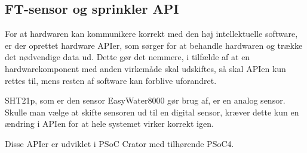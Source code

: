 \subsection{FT-sensor og sprinkler API}

For at hardwaren kan kommunikere korrekt med den høj intellektuelle software, er der oprettet hardware APIer, som sørger for at behandle hardwaren og trække det nødvendige data ud. Dette gør det nemmere, i tilfælde af at en hardwarekomponent med anden virkemåde skal udskiftes, så skal APIen kun rettes til, mens resten af software kan forblive uforandret. 

SHT21p, som er den sensor EasyWater8000 gør brug af, er en analog sensor. Skulle man vælge at skifte sensoren ud til en digital sensor, kræver dette kun en ændring i APIen for at hele systemet virker korrekt igen. 

Disse APIer er udviklet i PSoC Crator med tilhørende PSoC4. 